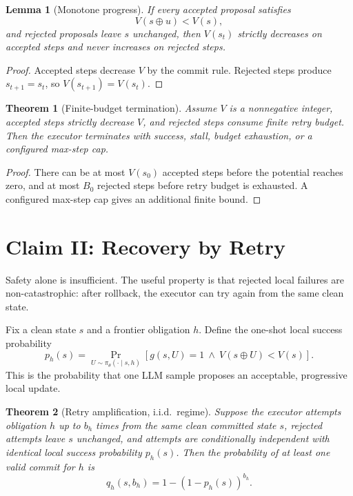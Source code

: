 \documentclass[11pt]{article}
\newtheorem{theorem}{Theorem}
\newtheorem{lemma}{Lemma}
\newcommand{\LLM}{\pi_\theta}
\newcommand{\pot}{V}
\begin{document}
\begin{lemma}[Monotone progress]
If every accepted proposal satisfies
\[
\pot(s \oplus u) < \pot(s),
\]
and rejected proposals leave $s$ unchanged, then $\pot(s_t)$ strictly decreases
on accepted steps and never increases on rejected steps.
\end{lemma}

\begin{proof}
Accepted steps decrease $\pot$ by the commit rule. Rejected steps produce
$s_{t+1}=s_t$, so $\pot(s_{t+1})=\pot(s_t)$.
\end{proof}

\begin{theorem}[Finite-budget termination]
Assume $\pot$ is a nonnegative integer, accepted steps strictly decrease $\pot$,
and rejected steps consume finite retry budget. Then the executor terminates
with success, stall, budget exhaustion, or a configured max-step cap.
\end{theorem}

\begin{proof}
There can be at most $\pot(s_0)$ accepted steps before the potential reaches
zero, and at most $B_0$ rejected steps before retry budget is exhausted. A
configured max-step cap gives an additional finite bound.
\end{proof}

\section{Claim II: Recovery by Retry}

Safety alone is insufficient. The useful property is that rejected local
failures are non-catastrophic: after rollback, the executor can try again from
the same clean state.

Fix a clean state $s$ and a frontier obligation $h$. Define the one-shot local
success probability
\[
p_h(s) =
\Pr_{U \sim \LLM(\cdot \mid s,h)}
\left[
g(s,U)=1
\ \wedge\
\pot(s\oplus U)<\pot(s)
\right].
\]
This is the probability that one LLM sample proposes an acceptable, progressive
local update.

\begin{theorem}[Retry amplification, i.i.d.\ regime]
\label{thm:retry-amplification}
Suppose the executor attempts obligation $h$ up to $b_h$ times from the same
clean committed state $s$, rejected attempts leave $s$ unchanged, and attempts
are conditionally independent with identical local success probability $p_h(s)$.
Then the probability of at least one valid commit for $h$ is
\[
q_h(s,b_h) =
1-(1-p_h(s))^{b_h}.
\]
\end{theorem}
\end{document}

